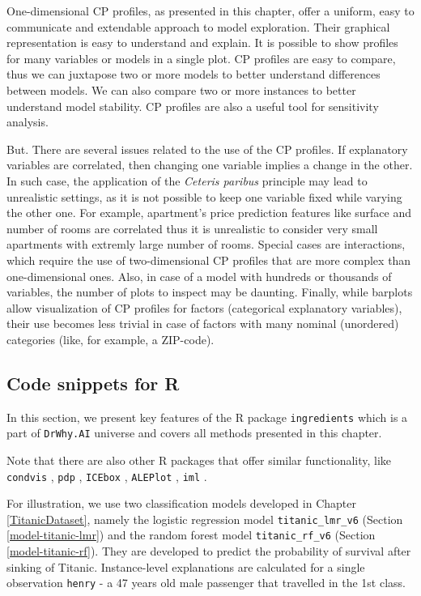 \documentclass[12pt,]{krantz}
\begin{document}
One-dimensional CP profiles, as presented in this chapter, offer a uniform, easy to communicate and extendable approach to model exploration. Their graphical representation is easy to understand and explain. It is possible to show profiles for many variables or models in a single plot. CP profiles are easy to compare, thus we can juxtapose two or more models to better understand differences between models. We can also compare two or more instances to better understand model stability. CP profiles are also a useful tool for sensitivity analysis.

But. There are several issues related to the use of the CP profiles. If explanatory variables are correlated, then changing one variable implies a change in the other. In such case, the application of the \emph{Ceteris paribus} principle may lead to unrealistic settings, as it is not possible to keep one variable fixed while varying the other one. For example, apartment's price prediction features like surface and number of rooms are correlated thus it is unrealistic to consider very small apartments with extremly large number of rooms. Special cases are interactions, which require the use of two-dimensional CP profiles that are more complex than one-dimensional ones. Also, in case of a model with hundreds or thousands of variables, the number of plots to inspect may be daunting. Finally, while barplots allow visualization of CP profiles for factors (categorical explanatory variables), their use becomes less trivial in case of factors with many nominal (unordered) categories (like, for example, a ZIP-code).

\hypertarget{CPR}{%
\subsection{Code snippets for R}\label{CPR}}

In this section, we present key features of the R package \texttt{ingredients} \citep{ingredientsRPackage} which is a part of \texttt{DrWhy.AI} universe and covers all methods presented in this chapter.

Note that there are also other R packages that offer similar functionality, like \texttt{condvis} \citep{condvisRPackage}, \texttt{pdp} \citep{pdpRPackage}, \texttt{ICEbox} \citep{ICEbox}, \texttt{ALEPlot} \citep{ALEPlotRPackage}, \texttt{iml} \citep{imlRPackage}.

For illustration, we use two classification models developed in Chapter \ref{TitanicDataset}, namely the logistic regression model \texttt{titanic\_lmr\_v6} (Section \ref{model-titanic-lmr}) and the random forest model \texttt{titanic\_rf\_v6} (Section \ref{model-titanic-rf}). They are developed to predict the probability of survival after sinking of Titanic. Instance-level explanations are calculated for a single observation \texttt{henry} - a 47 years old male passenger that travelled in the 1st class.
\end{document}
